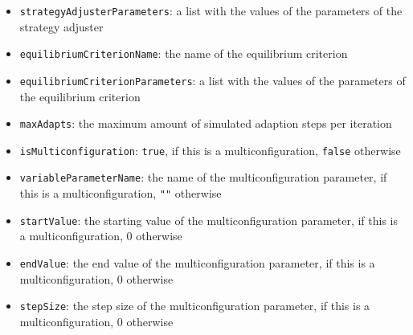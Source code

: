 \documentclass[parskip=full,11pt]{scrartcl}
\begin{document}
\begin{itemize}
\item[] \texttt{strategyAdjusterParameters}: a list with the values of the parameters of the strategy adjuster
\item[] \texttt{equilibriumCriterionName}: the name of the equilibrium criterion
\item[] \texttt{equilibriumCriterionParameters}: a list with the values of the parameters of the equilibrium criterion
\item[] \texttt{maxAdapts}: the maximum amount of simulated adaption steps per iteration
\item[] \texttt{isMulticonfiguration}: \texttt{true}, if this is a multiconfiguration, \texttt{false} otherwise
\item[] \texttt{variableParameterName}: the name of the multiconfiguration parameter, if this is a multiconfiguration, \texttt{""} otherwise
\item[] \texttt{startValue}: the starting value of the multiconfiguration parameter, if this is a multiconfiguration, \(0\) otherwise
\item[] \texttt{endValue}: the end value of the multiconfiguration parameter, if this is a multiconfiguration, \(0\) otherwise
\item[] \texttt{stepSize}: the step size of the multiconfiguration parameter, if this is a multiconfiguration, \(0\) otherwise
\end{itemize}
\end{document}

